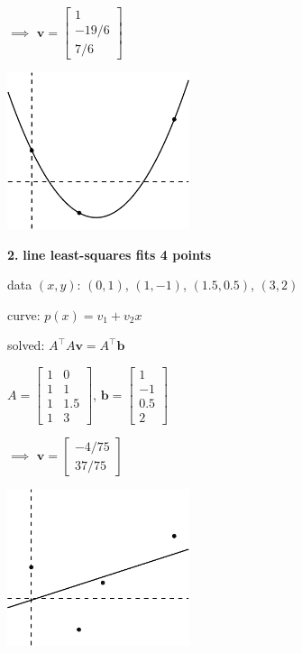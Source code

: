 \documentclass[12pt]{amsart}
\newcommand{\bb}{\mathbf{b}}
\newcommand{\bv}{\mathbf{v}}
\newcommand{\prob}[1]{\bigskip\noindent\textbf{#1.}\quad }
\newcommand{\ds}{\displaystyle}
\begin{document}
\msni $\implies$ \quad $\ds \bv = \begin{bmatrix} 1 \\ -19/6 \\ 7/6 \end{bmatrix}$

\vspace{-55mm}
\hfill \includegraphics[width=0.4\textwidth]{figs/mar21fig1.pdf}

\bigskip\bigskip
\prob{2} \textbf{line least-squares fits 4 points}

\msni data $(x,y)$: $(0,1)$, $(1,-1)$, $(1.5,0.5)$, $(3,2)$

\msni curve: $p(x) = v_1 + v_2 x$

\msni solved: $A^\top A \bv = A^\top \bb$

\msni $\ds A = \begin{bmatrix} 1 & 0 \\ 1 & 1 \\ 1 & 1.5 \\ 1 & 3 \end{bmatrix}$, \quad $\ds \bb = \begin{bmatrix} 1 \\ -1 \\ 0.5 \\ 2 \end{bmatrix}$

\msni $\implies$ \quad $\ds \bv = \begin{bmatrix} -4/75 \\ 37/75 \end{bmatrix}$

\vspace{-60mm}
\hfill \includegraphics[width=0.4\textwidth]{figs/mar21fig2.pdf}
\vfill
\end{document}
